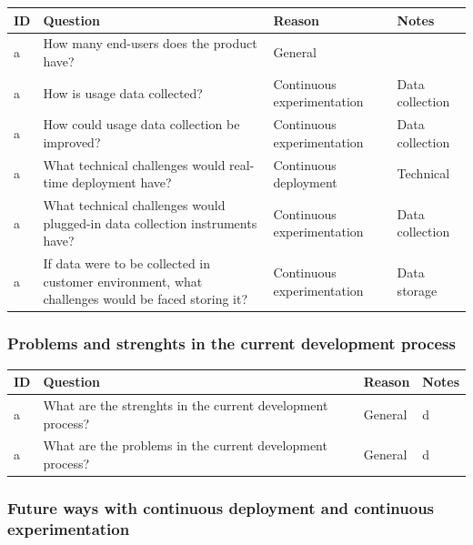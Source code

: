 \documentclass[english]{tktltiki2}
\theoremstyle{definition}
\theoremstyle{remark}
\begin{document}
\begin{center}
    \begin{tabular}{ | l | l | l | p{5cm} |}
    \hline
    ID & Question & Reason & Notes \\ \hline
    a & How many end-users does the product have? & General &  \\ \hline
    a & How is usage data collected? & Continuous experimentation & Data collection \\ \hline
    a & How could usage data collection be improved? & Continuous experimentation & Data collection \\ \hline

    a & What technical challenges would real-time deployment have? & Continuous deployment & Technical \\ \hline
    a & What technical challenges would plugged-in data collection instruments have? & Continuous experimentation & Data collection \\ \hline
    a & If data were to be collected in customer environment, what challenges would be faced storing it? & Continuous experimentation & Data storage \\ \hline
    \hline
    \end{tabular}
\end{center}

\subsubsection{Problems and strenghts in the current development process}

\begin{center}
    \begin{tabular}{ | l | l | l | p{5cm} |}
    \hline
    ID & Question & Reason & Notes \\ \hline
	a & What are the strenghts in the current development process? & General & d \\ \hline
    a & What are the problems in the current development process? & General & d \\ \hline
    \hline
    \end{tabular}
\end{center}

\subsubsection{Future ways with continuous deployment and continuous experimentation}
\end{document}
